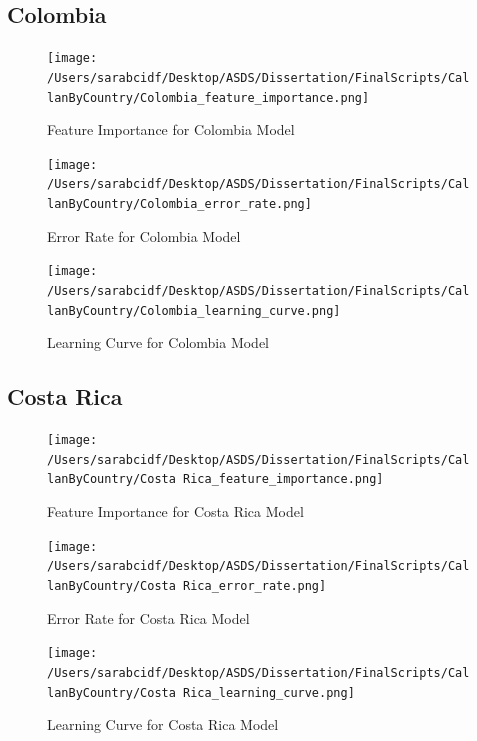 \documentclass[12pt,letterpaper]{article}
\begin{document}
	\subsection{Colombia}
	\begin{figure}[H]
		\centering
		\caption{Feature Importance for Colombia Model}
		\texttt{[image: /Users/sarabcidf/Desktop/ASDS/Dissertation/FinalScripts/CallanByCountry/Colombia\_feature\_importance.png]}
	\end{figure}
	\begin{figure}[H]
		\centering
		\caption{Error Rate for Colombia Model}
		\texttt{[image: /Users/sarabcidf/Desktop/ASDS/Dissertation/FinalScripts/CallanByCountry/Colombia\_error\_rate.png]}
	\end{figure}
	\begin{figure}[H]
		\centering
		\caption{Learning Curve for Colombia Model}
		\texttt{[image: /Users/sarabcidf/Desktop/ASDS/Dissertation/FinalScripts/CallanByCountry/Colombia\_learning\_curve.png]}
	\end{figure}
	
	\newpage
	
	\subsection{Costa Rica}
	\begin{figure}[H]
		\centering
		\caption{Feature Importance for Costa Rica Model}
		\texttt{[image: /Users/sarabcidf/Desktop/ASDS/Dissertation/FinalScripts/CallanByCountry/Costa  Rica\_feature\_importance.png]}
	\end{figure}
	\begin{figure}[H]
		\centering
		\caption{Error Rate for Costa Rica Model}
		\texttt{[image: /Users/sarabcidf/Desktop/ASDS/Dissertation/FinalScripts/CallanByCountry/Costa  Rica\_error\_rate.png]}
	\end{figure}
	\begin{figure}[H]
		\centering
		\caption{Learning Curve for Costa Rica Model}
		\texttt{[image: /Users/sarabcidf/Desktop/ASDS/Dissertation/FinalScripts/CallanByCountry/Costa  Rica\_learning\_curve.png]}
	\end{figure}
	
	\newpage
	
\end{document}
